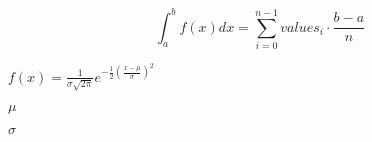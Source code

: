 \documentclass{article}
\begin{document}
\[
\int_{a}^{b} f(x) dx = \sum_{i=0}^{n-1} values_i \cdot \frac{b-a}{n}
\]
\pagebreak

$ f(x) = \frac{1}{\sigma\sqrt{2\pi}}e^{-\frac{1}{2}(\frac{x-\mu}{\sigma})^2} $
\pagebreak

$ \mu $
\pagebreak

$ \sigma $
\pagebreak
\end{document}
